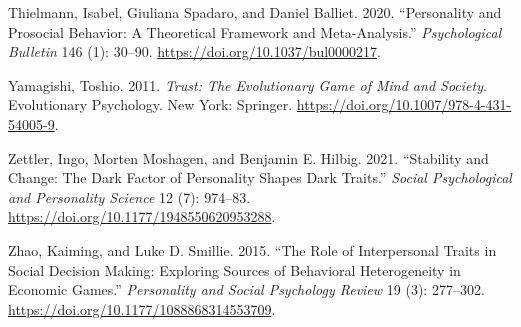 \documentclass[
]{article}
\newlength{\cslhangindent}
\newenvironment{CSLReferences}[2] %
 {\begin{list}{}{%
  \setlength{\itemindent}{0pt}
  \setlength{\leftmargin}{0pt}
  \setlength{\parsep}{0pt}
  \ifodd #1
   \setlength{\leftmargin}{\cslhangindent}
   \setlength{\itemindent}{-1\cslhangindent}
  \fi
  \setlength{\itemsep}{#2\baselineskip}}}
 {\end{list}}
\begin{document}
\begin{CSLReferences}{1}{0}
Thielmann, Isabel, Giuliana Spadaro, and Daniel Balliet. 2020. {``Personality and Prosocial Behavior: A Theoretical Framework and Meta-Analysis.''} \emph{Psychological Bulletin} 146 (1): 30--90. \url{https://doi.org/10.1037/bul0000217}.

Yamagishi, Toshio. 2011. \emph{Trust: The Evolutionary Game of Mind and Society}. Evolutionary Psychology. New York: Springer. \url{https://doi.org/10.1007/978-4-431-54005-9}.

Zettler, Ingo, Morten Moshagen, and Benjamin E. Hilbig. 2021. {``Stability and Change: {The} {Dark Factor of Personality} Shapes Dark Traits.''} \emph{Social Psychological and Personality Science} 12 (7): 974--83. \url{https://doi.org/10.1177/1948550620953288}.

Zhao, Kaiming, and Luke D. Smillie. 2015. {``The Role of Interpersonal Traits in Social Decision Making: {Exploring} Sources of Behavioral Heterogeneity in Economic Games.''} \emph{Personality and Social Psychology Review} 19 (3): 277--302. \url{https://doi.org/10.1177/1088868314553709}.

\end{CSLReferences}
\end{document}
